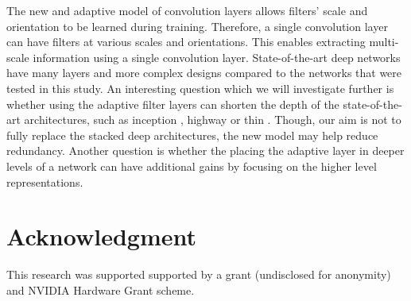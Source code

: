 \documentclass{bmvc2k}
\begin{document}
The new and adaptive model of convolution layers allows filters' scale and orientation to be learned during training. Therefore, a single convolution layer can have filters at various scales and orientations. This enables extracting multi-scale information using a single convolution layer. State-of-the-art deep networks have many layers and more complex designs compared to the networks that were tested in this study. An interesting question which we will investigate further is whether using the adaptive filter layers can shorten the depth of the state-of-the-art architectures, such as inception \cite{inceptionv1}, highway \cite{highway} or thin \cite{fitnets}. Though, our aim is not to fully replace the stacked deep architectures, the new model may help reduce redundancy. Another question is whether the placing the adaptive layer in deeper levels of a network can have additional gains by focusing on the higher level representations.


\section{Acknowledgment}
\label{sec:ack}
This research was supported supported by a grant (undisclosed for anonymity) and NVIDIA Hardware Grant scheme.


\end{document}
